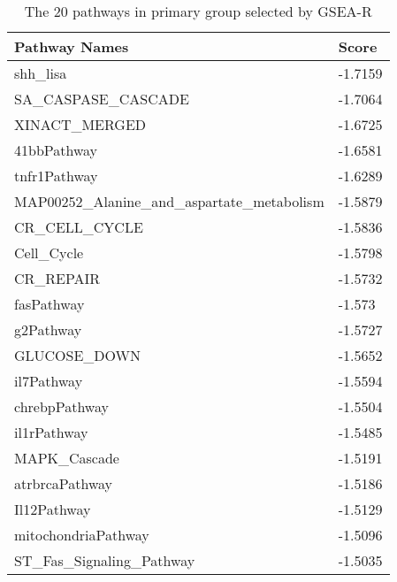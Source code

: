 \documentclass{scrartcl}
\numberwithin{figure}{section}
\numberwithin{table}{section}
\begin{document}
\begin{table}[h!]
\centering
\caption{The 20 pathways in primary group selected by GSEA-R}
\label{tab:gs2}
\bigskip
\begin{tabular}{ll}
\toprule
  Pathway Names                                             & Score   \\   
\midrule
  shh\_lisa                                                 & -1.7159 \\
  SA\_CASPASE\_CASCADE                                      & -1.7064 \\
  XINACT\_MERGED                                            & -1.6725 \\
  41bbPathway                                               & -1.6581 \\
  tnfr1Pathway                                              & -1.6289 \\
  MAP00252\_Alanine\_and\_aspartate\_metabolism             & -1.5879 \\
  CR\_CELL\_CYCLE                                           & -1.5836 \\
  Cell\_Cycle                                               & -1.5798 \\
  CR\_REPAIR                                                & -1.5732 \\
  fasPathway                                                & -1.573  \\
  g2Pathway                                                 & -1.5727 \\
  GLUCOSE\_DOWN                                             & -1.5652 \\
  il7Pathway                                                & -1.5594 \\
  chrebpPathway                                             & -1.5504 \\
  il1rPathway                                               & -1.5485 \\
  MAPK\_Cascade                                             & -1.5191 \\
  atrbrcaPathway                                            & -1.5186 \\
  Il12Pathway                                               & -1.5129 \\
  mitochondriaPathway                                       & -1.5096 \\
  ST\_Fas\_Signaling\_Pathway                               & -1.5035 \\
\bottomrule
\end{tabular}
\end{table}
\end{document}
